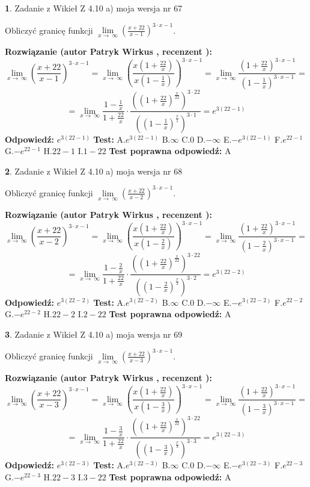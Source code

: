 \documentclass[12pt, a4paper]{article}
\theoremstyle{definition} %
\newtheorem{zad}{}
\newcommand{\zadStart}[1]{\begin{zad}#1\newline}
\newcommand{\zadStop}{\end{zad}}
\newcommand{\rozwStart}[2]{\noindent \textbf{Rozwiązanie (autor #1 , recenzent #2): }\newline}
\newcommand{\rozwStop}{\newline}
\newcommand{\odpStart}{\noindent \textbf{Odpowiedź:}\newline}
\newcommand{\odpStop}{\newline}
\newcommand{\testStart}{\noindent \textbf{Test:}\newline}
\newcommand{\testStop}{\newline}
\newcommand{\kluczStart}{\noindent \textbf{Test poprawna odpowiedź:}\newline}
\newcommand{\kluczStop}{\newline}
\begin{document}
\zadStart{Zadanie z Wikieł Z 4.10 a) moja wersja nr 67}


Obliczyć granicę funkcji  $\lim\limits_{x\to\ \infty}(\frac{x+22}{x-1})^{3\cdot x-1}$.
\zadStop
\rozwStart{Patryk Wirkus}{}
$$\lim\limits_{x\to\ \infty}(\frac{x+22}{x-1})^{3\cdot x-1} = \lim\limits_{x\to\ \infty}(\frac{x(1+\frac{22}{x})}{x(1-\frac{1}{x})})^{3\cdot x-1}=\lim\limits_{x\to\ \infty}\frac{(1+\frac{22}{x})^{3\cdot x-1}}{(1-\frac{1}{x})^{3\cdot x-1}}=$$
$$=\lim\limits_{x\to\ \infty}\frac{1-\frac{1}{x}}{1+\frac{22}{x}}\cdot\frac{((1+\frac{22}{x})^{\frac{x}{22}})^{3\cdot22}}{((1-\frac{1}{x})^{\frac{x}{1}})^{3\cdot1}}=e^{3(22-1)}$$
\rozwStop
\odpStart
$e^{3(22-1)}$
\odpStop
\testStart
A.$e^{3(22-1)}$ B.$\infty$ C.$0$ D.$-\infty$ E.$-e^{3(22-1)}$
F.$e^{22-1}$ G.$-e^{22-1}$
H.$22-1$
I.$1-22$
\testStop
\kluczStart
A
\kluczStop



\zadStart{Zadanie z Wikieł Z 4.10 a) moja wersja nr 68}


Obliczyć granicę funkcji  $\lim\limits_{x\to\ \infty}(\frac{x+22}{x-2})^{3\cdot x-1}$.
\zadStop
\rozwStart{Patryk Wirkus}{}
$$\lim\limits_{x\to\ \infty}(\frac{x+22}{x-2})^{3\cdot x-1} = \lim\limits_{x\to\ \infty}(\frac{x(1+\frac{22}{x})}{x(1-\frac{2}{x})})^{3\cdot x-1}=\lim\limits_{x\to\ \infty}\frac{(1+\frac{22}{x})^{3\cdot x-1}}{(1-\frac{2}{x})^{3\cdot x-1}}=$$
$$=\lim\limits_{x\to\ \infty}\frac{1-\frac{2}{x}}{1+\frac{22}{x}}\cdot\frac{((1+\frac{22}{x})^{\frac{x}{22}})^{3\cdot22}}{((1-\frac{2}{x})^{\frac{x}{2}})^{3\cdot2}}=e^{3(22-2)}$$
\rozwStop
\odpStart
$e^{3(22-2)}$
\odpStop
\testStart
A.$e^{3(22-2)}$ B.$\infty$ C.$0$ D.$-\infty$ E.$-e^{3(22-2)}$
F.$e^{22-2}$ G.$-e^{22-2}$
H.$22-2$
I.$2-22$
\testStop
\kluczStart
A
\kluczStop



\zadStart{Zadanie z Wikieł Z 4.10 a) moja wersja nr 69}


Obliczyć granicę funkcji  $\lim\limits_{x\to\ \infty}(\frac{x+22}{x-3})^{3\cdot x-1}$.
\zadStop
\rozwStart{Patryk Wirkus}{}
$$\lim\limits_{x\to\ \infty}(\frac{x+22}{x-3})^{3\cdot x-1} = \lim\limits_{x\to\ \infty}(\frac{x(1+\frac{22}{x})}{x(1-\frac{3}{x})})^{3\cdot x-1}=\lim\limits_{x\to\ \infty}\frac{(1+\frac{22}{x})^{3\cdot x-1}}{(1-\frac{3}{x})^{3\cdot x-1}}=$$
$$=\lim\limits_{x\to\ \infty}\frac{1-\frac{3}{x}}{1+\frac{22}{x}}\cdot\frac{((1+\frac{22}{x})^{\frac{x}{22}})^{3\cdot22}}{((1-\frac{3}{x})^{\frac{x}{3}})^{3\cdot3}}=e^{3(22-3)}$$
\rozwStop
\odpStart
$e^{3(22-3)}$
\odpStop
\testStart
A.$e^{3(22-3)}$ B.$\infty$ C.$0$ D.$-\infty$ E.$-e^{3(22-3)}$
F.$e^{22-3}$ G.$-e^{22-3}$
H.$22-3$
I.$3-22$
\testStop
\kluczStart
A
\kluczStop
\end{document}

